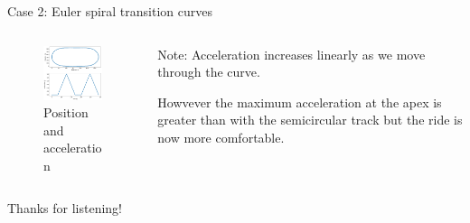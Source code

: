 \documentclass{beamer}
\begin{document}
\begin{frame}{Case 2: Euler spiral transition curves}
	\begin{columns}
		\begin{column}{0.8\textwidth}			
			\begin{figure}
				\caption{Position and acceleration}
				\centering
				\includegraphics[width=70mm, scale=0.2]{euler_track.png}
			\end{figure}
		\end{column}
		\begin{column}{0.33\textwidth}
			Note: Acceleration increases linearly as we move through the curve.
			
			Howvever the maximum acceleration at the apex is greater than with the semicircular track but the ride is now more comfortable.
					
		\end{column}
	\end{columns}

\end{frame}



\begin{frame}
	\centering
	Thanks for listening!
	 
\end{frame}
\end{document}
